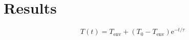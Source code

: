 \section{Results}\label{sec:results}

\begin{equation}\label{eq:cooling}
    T(t) = T_{\mathrm{env}} + (T_0 - T_{\mathrm{env}}) \mathrm{e}^{-t/\tau}
\end{equation}
